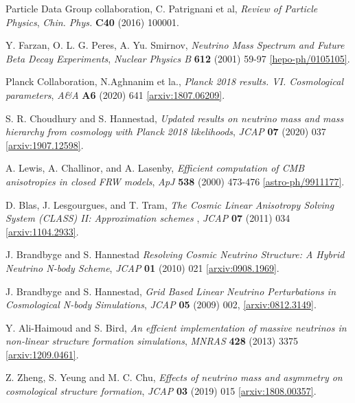 \documentclass[a4paper,11pt]{article}
\begin{document}
\begin{thebibliography}{99}

 Particle Data Group collaboration, C. Patrignani et al, \emph{Review of Particle Physics}, \emph{Chin. Phys.} {\bf C40} (2016) 100001. 

 Y. Farzan, O. L. G. Peres, A. Yu. Smirnov,
\emph{Neutrino Mass Spectrum and Future Beta Decay Experiments}, \emph{Nuclear Physics B} {\bf 612} (2001) 59-97
\href{https://arxiv.org/abs/hep-ph/0105105}{ [hepo-ph/0105105]}.

 Planck Collaboration, N.Aghnanim et la.,  \emph{Planck 2018 results. VI. Cosmological parameters}, \emph{A\&A} {\bf A6} (2020) 641
\href{https://arxiv.org/abs/1807.06209}{ [arxiv:1807.06209]}.

 S. R. Choudhury and S. Hannestad, \emph{Updated results on neutrino mass and mass hierarchy from cosmology with
Planck 2018 likelihoods}, \emph{JCAP} {\bf 07} (2020) 037
\href{https://arxiv.org/abs/1907.12598}{ [arxiv:1907.12598]}.


 A. Lewis, A. Challinor, and A. Lasenby, \emph{Efficient computation of CMB anisotropies in closed FRW models}, \emph{ApJ} {\bf 538} (2000) 473-476
\href{https://arxiv.org/abs/astro-ph/9911177}{ [astro-ph/9911177]}.

 D. Blas, J. Lesgourgues, and T. Tram, \emph{The Cosmic Linear Anisotropy Solving System (CLASS) II: Approximation schemes} , \emph{JCAP} {\bf 07} (2011) 034
\href{https://arxiv.org/abs/1104.2933}{ [arxiv:1104.2933]}.

J. Brandbyge and S. Hannestad \emph{Resolving Cosmic Neutrino Structure: A Hybrid Neutrino N-body Scheme}, \emph{JCAP} {\bf01} (2010) 021 \href{https://arxiv.org/abs/0908.1969}{[arxiv:0908.1969]}.

 J. Brandbyge and S. Hannestad, \emph{Grid Based Linear Neutrino Perturbations in Cosmological N-body Simulations}, \emph{JCAP} {\bf05} (2009) 002, \href{https://arxiv.org/abs/0812.3149}{[arxiv:0812.3149]}.

 Y. Ali-Haimoud and S. Bird, \emph{An effcient implementation of massive neutrinos in non-linear structure formation simulations}, \emph{MNRAS} {\bf428} (2013) 3375 \href{https://arxiv.org/abs/1209.0461}{[arxiv:1209.0461]}.

 Z. Zheng, S. Yeung and M. C. Chu, \emph{Effects of neutrino mass and asymmetry on cosmological structure formation}, \emph{JCAP} {\bf03} (2019) 015
\href{https://arxiv.org/abs/1808.00357}{ [arxiv:1808.00357]}.


\end{thebibliography}
\end{document}
